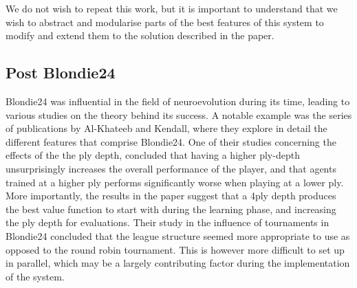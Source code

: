 \documentclass[12pt,a4paper]{article}
\begin{document}
        We do not wish to repeat this work, but it is important to understand that we wish to abstract and modularise parts of the best features of this system to modify and extend them to the solution described in the paper.

    \subsection{Post Blondie24}

        Blondie24 was influential in the field of neuroevolution during its time, leading to various studies on the theory behind its success. A notable example was the series of publications by Al-Khateeb and Kendall, where they explore in detail the different features that comprise Blondie24. One of their studies concerning the effects of the the ply depth, concluded that having a higher ply-depth unsurprisingly increases the overall performance of the player, and that agents trained at a higher ply performs significantly worse when playing at a lower ply. More importantly, the results in the paper suggest that a 4ply depth produces the best value function to start with during the learning phase, and increasing the ply depth for evaluations. \cite{al-khateeb_effect_2012} Their study in the influence of tournaments in Blondie24 concluded that the league structure seemed more appropriate to use as opposed to the round robin tournament. \cite{al-khateeb_introducing_2009} This is however more difficult to set up in parallel, which may be a largely contributing factor during the implementation of the system.
        

        
\end{document}
